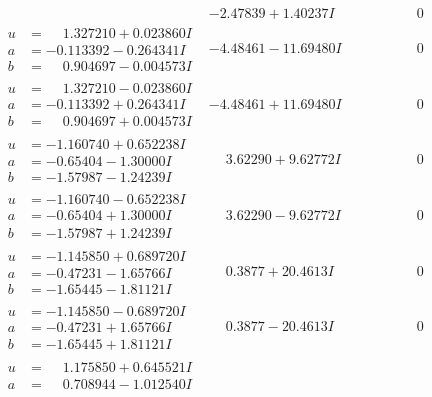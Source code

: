 \documentclass[1p]{elsarticle_modified}
\theoremstyle{definition}
\begin{document}
$$\begin{array}{c|c|c}
 & -2.47839 + 1.40237 I & \phantom{-0.000000 } 0 \\ \hline\begin{aligned}
u &= \phantom{-}1.327210 + 0.023860 I \\
a &= -0.113392 - 0.264341 I \\
b &= \phantom{-}0.904697 - 0.004573 I\end{aligned}
 & -4.48461 - 11.69480 I & \phantom{-0.000000 } 0 \\ \hline\begin{aligned}
u &= \phantom{-}1.327210 - 0.023860 I \\
a &= -0.113392 + 0.264341 I \\
b &= \phantom{-}0.904697 + 0.004573 I\end{aligned}
 & -4.48461 + 11.69480 I & \phantom{-0.000000 } 0 \\ \hline\begin{aligned}
u &= -1.160740 + 0.652238 I \\
a &= -0.65404 - 1.30000 I \\
b &= -1.57987 - 1.24239 I\end{aligned}
 & \phantom{-}3.62290 + 9.62772 I & \phantom{-0.000000 } 0 \\ \hline\begin{aligned}
u &= -1.160740 - 0.652238 I \\
a &= -0.65404 + 1.30000 I \\
b &= -1.57987 + 1.24239 I\end{aligned}
 & \phantom{-}3.62290 - 9.62772 I & \phantom{-0.000000 } 0 \\ \hline\begin{aligned}
u &= -1.145850 + 0.689720 I \\
a &= -0.47231 - 1.65766 I \\
b &= -1.65445 - 1.81121 I\end{aligned}
 & \phantom{-}0.3877 + 20.4613 I & \phantom{-0.000000 } 0 \\ \hline\begin{aligned}
u &= -1.145850 - 0.689720 I \\
a &= -0.47231 + 1.65766 I \\
b &= -1.65445 + 1.81121 I\end{aligned}
 & \phantom{-}0.3877 - 20.4613 I & \phantom{-0.000000 } 0 \\ \hline\begin{aligned}
u &= \phantom{-}1.175850 + 0.645521 I \\
a &= \phantom{-}0.708944 - 1.012540 I \\

\end{aligned}
\end{array}$$
\end{document}

